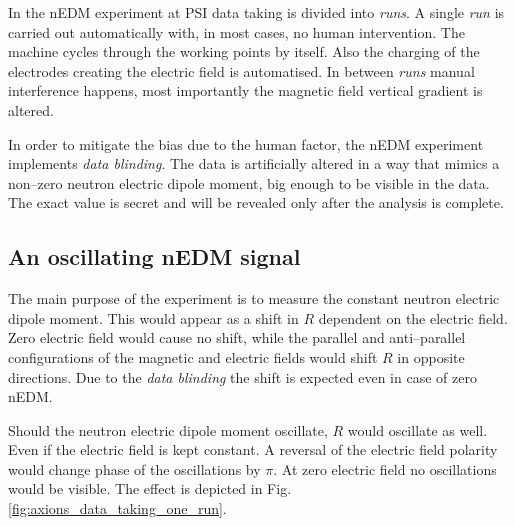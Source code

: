 In the nEDM experiment at PSI data taking is divided into \emph{runs}. A single \emph{run} is carried out automatically with, in most cases, no human intervention. The machine cycles through the working points by itself. Also the charging of the electrodes creating the electric field is automatised. In between \emph{runs} manual interference happens, most importantly the magnetic field vertical gradient is altered.

In order to mitigate the bias due to the human factor, the nEDM experiment implements \emph{data blinding}. The data is artificially altered in a way that mimics a non--zero neutron electric dipole moment, big enough to be visible in the data. The exact value is secret and will be revealed only after the analysis is complete.


\subsection{An oscillating nEDM signal}
The main purpose of the experiment is to measure the constant neutron electric dipole moment. This would appear as a shift in $R$ dependent on the electric field. Zero electric field would cause no shift, while the parallel and anti--parallel configurations of the magnetic and electric fields would shift $R$ in opposite directions. Due to the \emph{data blinding} the shift is expected even in case of zero nEDM.

Should the neutron electric dipole moment oscillate, $R$ would oscillate as well. Even if the electric field is kept constant. A reversal of the electric field polarity would change phase of the oscillations by $\pi$. At zero electric field no oscillations would be visible. The effect is depicted in Fig.\,\ref{fig:axions_data_taking_one_run}.


